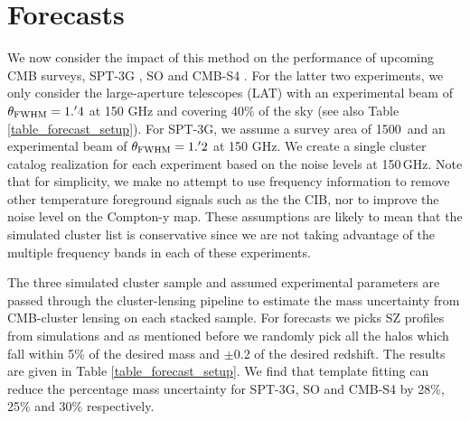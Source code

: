 \section{Forecasts}
\label{forecasts}

We now consider the impact of this method on the performance of upcoming CMB surveys, SPT-3G \citep{bender18}, SO \citep{so18} and CMB-S4 \citep{cmbs4-sb1}. 
For the latter two experiments, we only consider the large-aperture telescopes (LAT) with an experimental beam of $\theta_{\rm FWHM} = 1.^{\prime}4$ at 150 GHz and covering 40\% of the sky (see also Table \ref{table_forecast_setup}). 
For SPT-3G, we assume a survey area of 1500\,\sqdeg{} and an experimental beam of $\theta_{\rm FWHM} = 1.^{\prime}2$ at 150 GHz. 
We create a single cluster catalog realization for each experiment based on the noise levels at 150\,GHz. 
Note that for simplicity, we make no attempt to use frequency information to remove other temperature foreground signals such as the the CIB, nor to improve the noise level on the Compton-y map. 
These assumptions are likely to mean that the simulated cluster list is conservative since we are not taking advantage of the multiple frequency bands in each of these experiments. 



The three simulated cluster sample and assumed experimental parameters are passed through the cluster-lensing pipeline to estimate the mass uncertainty from CMB-cluster lensing on each stacked sample. 
 For forecasts we picks SZ profiles from \cite{takahashi17} simulations and as mentioned before we randomly pick all the halos which fall within 5\% of the desired mass and $\pm$0.2 of the desired redshift.
The results are given in Table \ref{table_forecast_setup}. 
We find that template fitting can reduce the percentage mass uncertainty for SPT-3G, SO and CMB-S4 by 28\%, 25\% and 30\% respectively.%


